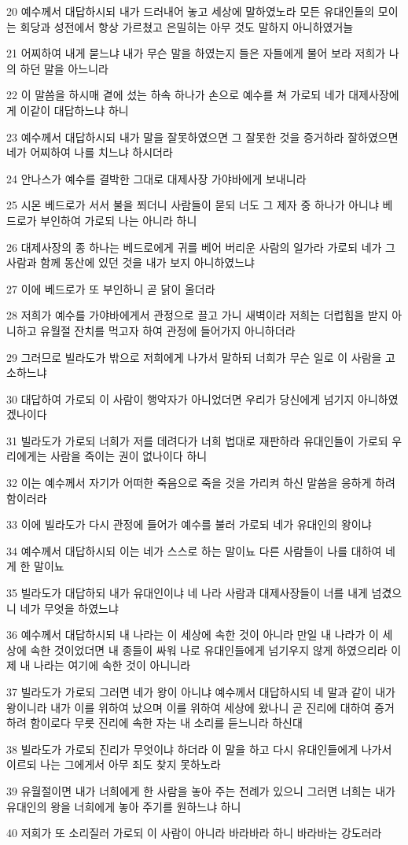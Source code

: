 \par 20 예수께서 대답하시되 내가 드러내어 놓고 세상에 말하였노라 모든 유대인들의 모이는 회당과 성전에서 항상 가르쳤고 은밀히는 아무 것도 말하지 아니하였거늘
\par 21 어찌하여 내게 묻느냐 내가 무슨 말을 하였는지 들은 자들에게 물어 보라 저희가 나의 하던 말을 아느니라
\par 22 이 말씀을 하시매 곁에 섰는 하속 하나가 손으로 예수를 쳐 가로되 네가 대제사장에게 이같이 대답하느냐 하니
\par 23 예수께서 대답하시되 내가 말을 잘못하였으면 그 잘못한 것을 증거하라 잘하였으면 네가 어찌하여 나를 치느냐 하시더라
\par 24 안나스가 예수를 결박한 그대로 대제사장 가야바에게 보내니라
\par 25 시몬 베드로가 서서 불을 쬐더니 사람들이 묻되 너도 그 제자 중 하나가 아니냐 베드로가 부인하여 가로되 나는 아니라 하니
\par 26 대제사장의 종 하나는 베드로에게 귀를 베어 버리운 사람의 일가라 가로되 네가 그 사람과 함께 동산에 있던 것을 내가 보지 아니하였느냐
\par 27 이에 베드로가 또 부인하니 곧 닭이 울더라
\par 28 저희가 예수를 가야바에게서 관정으로 끌고 가니 새벽이라 저희는 더럽힘을 받지 아니하고 유월절 잔치를 먹고자 하여 관정에 들어가지 아니하더라
\par 29 그러므로 빌라도가 밖으로 저희에게 나가서 말하되 너희가 무슨 일로 이 사람을 고소하느냐
\par 30 대답하여 가로되 이 사람이 행악자가 아니었더면 우리가 당신에게 넘기지 아니하였겠나이다
\par 31 빌라도가 가로되 너희가 저를 데려다가 너희 법대로 재판하라 유대인들이 가로되 우리에게는 사람을 죽이는 권이 없나이다 하니
\par 32 이는 예수께서 자기가 어떠한 죽음으로 죽을 것을 가리켜 하신 말씀을 응하게 하려 함이러라
\par 33 이에 빌라도가 다시 관정에 들어가 예수를 불러 가로되 네가 유대인의 왕이냐
\par 34 예수께서 대답하시되 이는 네가 스스로 하는 말이뇨 다른 사람들이 나를 대하여 네게 한 말이뇨
\par 35 빌라도가 대답하되 내가 유대인이냐 네 나라 사람과 대제사장들이 너를 내게 넘겼으니 네가 무엇을 하였느냐
\par 36 예수께서 대답하시되 내 나라는 이 세상에 속한 것이 아니라 만일 내 나라가 이 세상에 속한 것이었더면 내 종들이 싸워 나로 유대인들에게 넘기우지 않게 하였으리라 이제 내 나라는 여기에 속한 것이 아니니라
\par 37 빌라도가 가로되 그러면 네가 왕이 아니냐 예수께서 대답하시되 네 말과 같이 내가 왕이니라 내가 이를 위하여 났으며 이를 위하여 세상에 왔나니 곧 진리에 대하여 증거하려 함이로다 무릇 진리에 속한 자는 내 소리를 듣느니라 하신대
\par 38 빌라도가 가로되 진리가 무엇이냐 하더라 이 말을 하고 다시 유대인들에게 나가서 이르되 나는 그에게서 아무 죄도 찾지 못하노라
\par 39 유월절이면 내가 너희에게 한 사람을 놓아 주는 전례가 있으니 그러면 너희는 내가 유대인의 왕을 너희에게 놓아 주기를 원하느냐 하니
\par 40 저희가 또 소리질러 가로되 이 사람이 아니라 바라바라 하니 바라바는 강도러라

